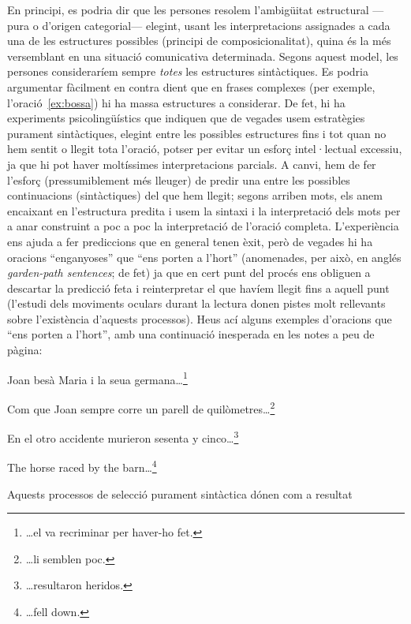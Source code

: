 En principi, es podria dir que les persones resolem l'ambigüitat
estructural ---pura o d'origen categorial--- elegint, usant les
interpretacions assignades a cada una de les estructures possibles
(principi de composicionalitat), quina és la més versemblant en una
situació comunicativa determinada. Segons aquest model, les persones
consideraríem sempre \emph{totes} les estructures sintàctiques. Es
podria argumentar fàcilment en contra dient que en frases complexes
(per exemple, l'oració~\ref{ex:bossa}) hi ha massa estructures a considerar. De
fet, hi ha experiments psicolingüístics que indiquen que de vegades
usem estratègies purament sintàctiques, elegint entre les possibles
estructures fins i tot quan no hem sentit o llegit tota l'oració,
potser per evitar un esforç intel·lectual excessiu, ja que hi pot
haver moltíssimes interpretacions parcials. A canvi, hem de fer
l'esforç (pressumiblement més lleuger) de predir una entre les
possibles continuacions (sintàctiques) del que hem llegit; segons
arriben mots, els anem encaixant en l'estructura predita i usem la
sintaxi i la interpretació dels mots per a anar construint a poc a poc
la interpretació de l'oració completa.  L'experiència ens ajuda a fer
prediccions que en general tenen èxit, però de vegades hi ha oracions
``enganyoses'' que ``ens porten a l'hort'' (anomenades, per això, en
anglés \emph{garden-path sentences}; de fet) ja que en cert punt del
procés ens obliguen a descartar la predicció feta i reinterpretar el
que havíem llegit fins a aquell punt (l'estudi dels moviments oculars
durant la lectura donen pistes molt rellevants sobre l'existència
d'aquests processos).  Heus ací alguns exemples d'oracions que ``ens
porten a l'hort'', amb una continuació inesperada en les notes a peu
de pàgina:
\begin{exemple}
Joan besà Maria i la seua germana\ldots\footnote{\ldots el
        va recriminar per haver-ho fet.}
\end{exemple}
\begin{exemple}
    Com que Joan sempre corre un parell
      de quilòmetres\ldots\footnote{\ldots li semblen poc.}
\end{exemple}
\begin{exemple}
    En el otro accidente murieron sesenta y
      cinco\ldots\footnote{\ldots resultaron heridos.} 
\end{exemple}
\begin{exemple}
    The horse raced by the barn\ldots\footnote{\ldots fell
        down.}
\end{exemple}
Aquests processos de selecció purament sintàctica dónen com a resultat

